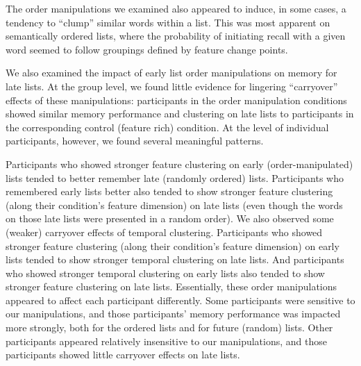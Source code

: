 \documentclass[11pt]{article}
\begin{document}
The order manipulations we examined also appeared to induce, in some cases, a
tendency to ``clump'' similar words within a list. This was most apparent on
semantically ordered lists, where the probability of initiating recall with a
given word seemed to follow groupings defined by feature change points.

We also examined the impact of early list order manipulations on memory for
late lists. At the group level, we found little evidence for lingering
``carryover'' effects of these manipulations: participants in the order
manipulation conditions showed similar memory performance and clustering on
late lists to participants in the corresponding control (feature rich)
condition. At the level of individual participants, however, we found several
meaningful patterns.

Participants who showed stronger feature clustering on early
(order-manipulated) lists tended to better remember late (randomly ordered)
lists. Participants who remembered early lists better also tended to show
stronger feature clustering (along their condition's feature dimension) on late
lists (even though the words on those late lists were presented in a random
order). We also observed some (weaker) carryover effects of temporal
clustering. Participants who showed stronger feature clustering (along their
condition's feature dimension) on early lists tended to show stronger temporal
clustering on late lists. And participants who showed stronger temporal
clustering on early lists also tended to show stronger feature clustering on
late lists. Essentially, these order manipulations appeared to affect each
participant differently. Some participants were sensitive to our manipulations,
and those participants' memory performance was impacted more strongly, both for
the ordered lists and for future (random) lists. Other participants appeared
relatively insensitive to our manipulations, and those participants showed
little carryover effects on late lists.
\end{document}
